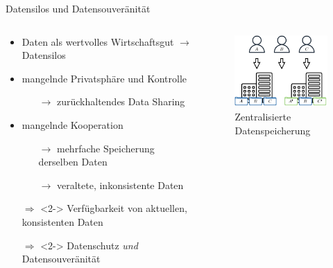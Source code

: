 \begin{frame}{Datensilos und Datensouveränität}
    \begin{columns}
        \begin{column}{0.65\textwidth}
            \begin{itemize}
                \item Daten als wertvolles Wirtschaftsgut $\to$ Datensilos
                \item mangelnde Privatsphäre und Kontrolle
                \begin{itemize}
                    \item[$\to$] zurückhaltendes Data Sharing
                \end{itemize}
                \item mangelnde Kooperation
                \begin{itemize}
                    \item[$\to$] mehrfache Speicherung derselben Daten
                    \item[$\to$] veraltete, inkonsistente Daten
                \end{itemize}
        
                \item[$\Rightarrow$]<2-> Verfügbarkeit von aktuellen, konsistenten Daten
                \item[$\Rightarrow$]<2-> Datenschutz \emph{und} Datensouveränität
            \end{itemize}
        \end{column}

        \begin{column}{0.35\textwidth}
            \vspace{2em}
            \begin{figure}
                \includegraphics[width=\textwidth]{./assets/central.drawio.pdf}
                \caption{Zentralisierte Datenspeicherung}
            \end{figure}
        \end{column}
    \end{columns}


\end{frame}
